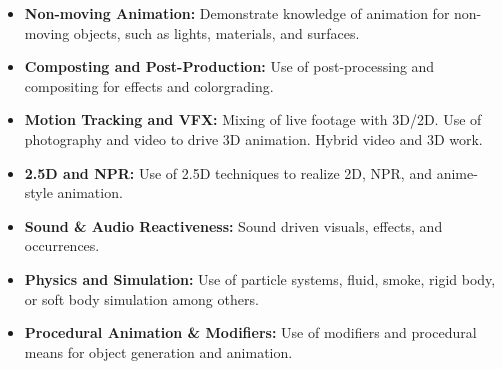 \begin{itemize}
\begin{itemize}
		      \item \textbf{Non-moving Animation:} Demonstrate knowledge of animation for non-moving objects, such as lights, materials, and surfaces.
		      \item \textbf{Composting and Post-Production:} Use of post-processing and compositing for effects and colorgrading.
		      \item \textbf{Motion Tracking and VFX:} Mixing of live footage with 3D/2D. Use of photography and video to drive 3D animation. Hybrid video and 3D work.
		      \item \textbf{2.5D and NPR:} Use of 2.5D techniques to realize 2D, NPR, and anime-style animation.
		      \item \textbf{Sound \& Audio Reactiveness:} Sound driven visuals, effects, and occurrences.
		      \item \textbf{Physics and Simulation:} Use of particle systems, fluid, smoke, rigid body, or soft body simulation among others.
		      \item \textbf{Procedural Animation \& Modifiers:} Use of modifiers and procedural means for object generation and animation.
	      \end{itemize}
\end{itemize}
